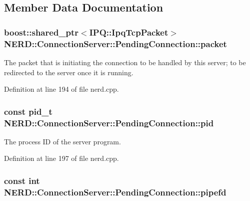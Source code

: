 \subsection{\-Member \-Data \-Documentation}
\hypertarget{structNERD_1_1ConnectionServer_1_1PendingConnection_ad536775b738bdf1f819d7ad416214b71}{
\subsubsection[{packet}]{\setlength{\rightskip}{0pt plus 5cm}boost\-::shared\-\_\-ptr$<${\bf \-I\-P\-Q\-::\-Ipq\-Tcp\-Packet}$>$ {\bf \-N\-E\-R\-D\-::\-Connection\-Server\-::\-Pending\-Connection\-::packet}}}
\label{structNERD_1_1ConnectionServer_1_1PendingConnection_ad536775b738bdf1f819d7ad416214b71}


\-The packet that is initiating the connection to be handled by this server; to be redirected to the server once it is running. 



\-Definition at line 194 of file nerd.\-cpp.

\hypertarget{structNERD_1_1ConnectionServer_1_1PendingConnection_a7a98b508720b6c7bc1f2028c3b2696d5}{
\subsubsection[{pid}]{\setlength{\rightskip}{0pt plus 5cm}const pid\-\_\-t {\bf \-N\-E\-R\-D\-::\-Connection\-Server\-::\-Pending\-Connection\-::pid}}}
\label{structNERD_1_1ConnectionServer_1_1PendingConnection_a7a98b508720b6c7bc1f2028c3b2696d5}


\-The process \-I\-D of the server program. 



\-Definition at line 197 of file nerd.\-cpp.

\hypertarget{structNERD_1_1ConnectionServer_1_1PendingConnection_a227bb11370e616eab7eb9a67b4cdf4ca}{
\subsubsection[{pipefd}]{\setlength{\rightskip}{0pt plus 5cm}const int {\bf \-N\-E\-R\-D\-::\-Connection\-Server\-::\-Pending\-Connection\-::pipefd}}}
\label{structNERD_1_1ConnectionServer_1_1PendingConnection_a227bb11370e616eab7eb9a67b4cdf4ca}


